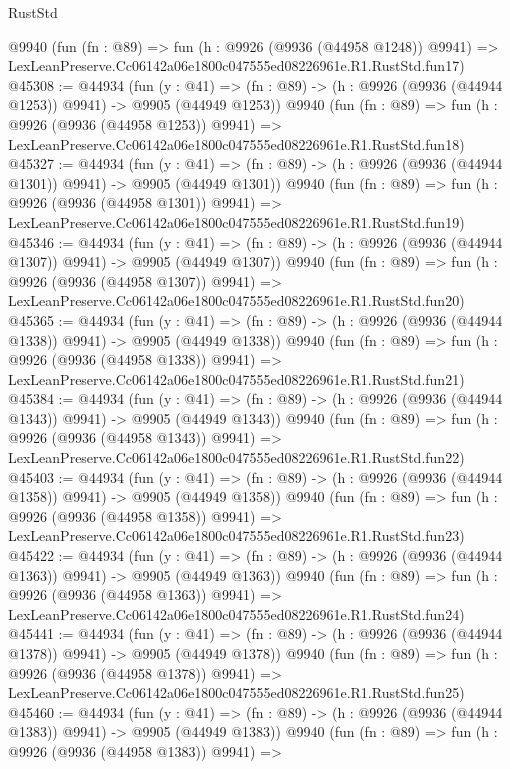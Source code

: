 \begin{lexlean}{RustStd}
\begin{coremodule}
    @9940
    (fun (fn : @89) =>
    fun (h : @9926 (@9936 (@44958 @1248)) @9941) =>
    LexLeanPreserve.Cc06142a06e1800c047555ed08226961e.R1.RustStd.fun17)
@45308 := @44934
    (fun (y : @41) =>
    (fn : @89) -> (h : @9926 (@9936 (@44944 @1253)) @9941) -> @9905 (@44949 @1253))
    @9940
    (fun (fn : @89) =>
    fun (h : @9926 (@9936 (@44958 @1253)) @9941) =>
    LexLeanPreserve.Cc06142a06e1800c047555ed08226961e.R1.RustStd.fun18)
@45327 := @44934
    (fun (y : @41) =>
    (fn : @89) -> (h : @9926 (@9936 (@44944 @1301)) @9941) -> @9905 (@44949 @1301))
    @9940
    (fun (fn : @89) =>
    fun (h : @9926 (@9936 (@44958 @1301)) @9941) =>
    LexLeanPreserve.Cc06142a06e1800c047555ed08226961e.R1.RustStd.fun19)
@45346 := @44934
    (fun (y : @41) =>
    (fn : @89) -> (h : @9926 (@9936 (@44944 @1307)) @9941) -> @9905 (@44949 @1307))
    @9940
    (fun (fn : @89) =>
    fun (h : @9926 (@9936 (@44958 @1307)) @9941) =>
    LexLeanPreserve.Cc06142a06e1800c047555ed08226961e.R1.RustStd.fun20)
@45365 := @44934
    (fun (y : @41) =>
    (fn : @89) -> (h : @9926 (@9936 (@44944 @1338)) @9941) -> @9905 (@44949 @1338))
    @9940
    (fun (fn : @89) =>
    fun (h : @9926 (@9936 (@44958 @1338)) @9941) =>
    LexLeanPreserve.Cc06142a06e1800c047555ed08226961e.R1.RustStd.fun21)
@45384 := @44934
    (fun (y : @41) =>
    (fn : @89) -> (h : @9926 (@9936 (@44944 @1343)) @9941) -> @9905 (@44949 @1343))
    @9940
    (fun (fn : @89) =>
    fun (h : @9926 (@9936 (@44958 @1343)) @9941) =>
    LexLeanPreserve.Cc06142a06e1800c047555ed08226961e.R1.RustStd.fun22)
@45403 := @44934
    (fun (y : @41) =>
    (fn : @89) -> (h : @9926 (@9936 (@44944 @1358)) @9941) -> @9905 (@44949 @1358))
    @9940
    (fun (fn : @89) =>
    fun (h : @9926 (@9936 (@44958 @1358)) @9941) =>
    LexLeanPreserve.Cc06142a06e1800c047555ed08226961e.R1.RustStd.fun23)
@45422 := @44934
    (fun (y : @41) =>
    (fn : @89) -> (h : @9926 (@9936 (@44944 @1363)) @9941) -> @9905 (@44949 @1363))
    @9940
    (fun (fn : @89) =>
    fun (h : @9926 (@9936 (@44958 @1363)) @9941) =>
    LexLeanPreserve.Cc06142a06e1800c047555ed08226961e.R1.RustStd.fun24)
@45441 := @44934
    (fun (y : @41) =>
    (fn : @89) -> (h : @9926 (@9936 (@44944 @1378)) @9941) -> @9905 (@44949 @1378))
    @9940
    (fun (fn : @89) =>
    fun (h : @9926 (@9936 (@44958 @1378)) @9941) =>
    LexLeanPreserve.Cc06142a06e1800c047555ed08226961e.R1.RustStd.fun25)
@45460 := @44934
    (fun (y : @41) =>
    (fn : @89) -> (h : @9926 (@9936 (@44944 @1383)) @9941) -> @9905 (@44949 @1383))
    @9940
    (fun (fn : @89) =>
    fun (h : @9926 (@9936 (@44958 @1383)) @9941) =>

\end{coremodule}
\end{lexlean}
